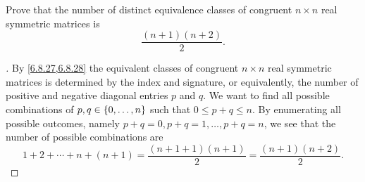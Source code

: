 \begin{ex}\label{ex:6.8.26}
  Prove that the number of distinct equivalence classes of congruent \(n \times n\) real symmetric matrices is
  \[
    \dfrac{(n + 1)(n + 2)}{2}.
  \]
\end{ex}

\begin{proof}[]
  By \cref{6.8.27,6.8.28} the equivalent classes of congruent \(n \times n\) real symmetric matrices is determined by the index and signature, or equivalently, the number of positive and negative diagonal entries \(p\) and \(q\).
  We want to find all possible combinations of \(p, q \in \left\lbrace0, \dots, n\right\rbrace\) such that \(0 \leq p + q \leq n\).
  By enumerating all possible outcomes, namely \(p + q = 0, p + q = 1, \dots, p + q = n\), we see that the number of possible combinations are
  \[
    1 + 2 + \cdots + n + (n + 1) = \dfrac{(n + 1 + 1) (n + 1)}{2} = \dfrac{(n + 1)(n + 2)}{2}.
  \]
\end{proof}
